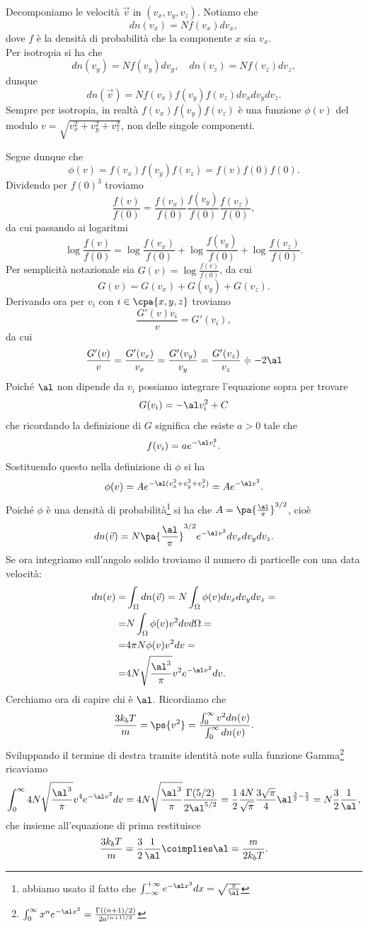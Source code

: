 \noindent
Decomponiamo le velocit\`a $\vec v$ in $(v_x,v_y,v_z)$. Notiamo che
\[dn(v_x)=Nf(v_x)dv_x,\]
dove $f$ \`e la densit\`a di probabilit\`a che la componente $x$ sia $v_x$.\\
Per isotropia si ha che
\[dn(v_y)=Nf(v_y)dv_y,\quad dn(v_z)=Nf(v_z)dv_z,\]
dunque
\[dn(\vec v)=N f(v_x)f(v_y)f(v_z)dv_xdv_ydv_z.\]
Sempre per isotropia, in realt\`a $f(v_x)f(v_y)f(v_z)$ \`e una funzione $\phi(v)$ del modulo $v=\sqrt{v_x^2+v_y^2+v_z^2}$, non delle singole componenti.\bigskip

\noindent
Segue dunque che
\[\phi(v)=f(v_x)f(v_y)f(v_z)=f(v)f(0)f(0).\]
Dividendo per $f(0)^3$ troviamo
\[\frac{f(v)}{f(0)}=\frac{f(v_x)}{f(0)}\frac{f(v_y)}{f(0)}\frac{f(v_z)}{f(0)},\]
da cui passando ai logaritmi
\[\log\frac{f(v)}{f(0)}=\log \frac{f(v_x)}{f(0)}+\log\frac{f(v_y)}{f(0)}+\log\frac{f(v_z)}{f(0)}.\]
Per semplicit\`a notazionale sia $G(v)=\log\frac{f(v)}{f(0)}$, da cui
\[G(v)=G(v_x)+G(v_y)+G(v_z).\]
Derivando ora per $v_i$ con $i\in\cpa{x,y,z}$ troviamo
\[\frac{G'(v)v_i}v=G'(v_i),\]
da cui
\[\frac{G'(v)}{v}=\frac{G'(v_x)}{v_x}=\frac{G'(v_y)}{v_y}=\frac{G'(v_z)}{v_z}\doteqdot -2\al\]
Poich\'e $\al$ non dipende da $v_i$ possiamo integrare l'equazione sopra per trovare
\[G(v_i)=-\al v_i^2+C\]
che ricordando la definizione di $G$ significa che esiste $a>0$ tale che
\[f(v_i)=ae^{-\al v_i^2}.\]
Sostituendo questo nella definizione di $\phi$ si ha
\[\phi(v)=Ae^{-\al (v_x^2+v_y^2+v_z^2)}=Ae^{-\al v^2}.\]
Poich\'e $\phi$ \`e una densit\`a di probabilit\`a\footnote{abbiamo usato il fatto che $\int_{-\infty}^{+\infty}e^{-\al x^2}dx=\sqrt{\frac{\pi}\al}$} si ha che $A=\pa{\frac{\al}\pi}^{3/2}$, cio\`e
\[dn(\vec v)=N\pa{\frac{\al}\pi}^{3/2}e^{-\al v^2} dv_xdv_ydv_z.\]
Se ora integriamo sull'angolo solido troviamo il numero di particelle con una data velocit\`a:
\begin{align*}
dn(v)=&\int_\Omega dn(\vec v)=N\int_\Omega \phi(v)dv_xdv_ydv_z=\\
=&N\int_\Omega \phi(v)v^2dvd\Omega=\\
=&4\pi N\phi(v)v^2dv=\\
=&4N\sqrt{\frac{\al^3}\pi}v^2e^{-\al v^2}dv.
\end{align*}
Cerchiamo ora di capire chi \`e $\al$. Ricordiamo che 
\[\frac{3k_bT}m=\ps{v^2}=\frac{\int_0^\infty v^2dn(v)}{\int_0^\infty dn(v)}.\]
Sviluppando il termine di destra tramite identit\`a note sulla funzione Gamma\footnote{$\int_0^\infty x^ne^{-\al x^2}=\frac{\Gamma((n+1)/2)}{2a^{(n+1)/2}}$} ricaviamo
\[\int_0^\infty 4N\sqrt{\frac{\al^3}\pi} v^4e^{-\al v^2}dv=4N\sqrt{\frac{\al^3}\pi}\frac{\Gamma(5/2)}{2\al^{5/2}}=\frac12\frac{4N}{\sqrt\pi}\frac{3\sqrt \pi}4 \al^{\frac32-\frac52}=N\frac32\frac1\al,\]
che insieme all'equazione di prima restituisce
\[\frac{3k_b T}m=\frac32\frac1\al\coimplies\al=\frac m{2k_bT}.\]
\medskip


